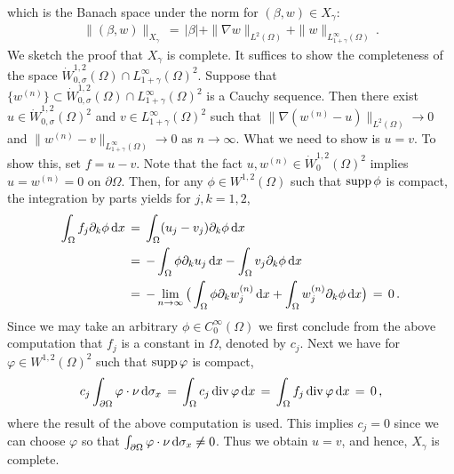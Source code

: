 \documentclass[11pt,a4paper]{article}
\newcommand{\dd}{\,{\rm d}}
\begin{document}
%
which is the Banach space under the norm for $(\beta, w) \in X_\gamma$:
%
\begin{align}
\| (\beta, w) \|_{X_\gamma} \, = \, |\beta| + \| \nabla w\|_{L^2(\Omega)} + \| w \|_{L^\infty_{1+\gamma}(\Omega)}\,.
\end{align} 
%
We sketch the proof that $X_\gamma$ is complete. It suffices to show the completeness of the space $\dot{W}^{1,2}_{0,\sigma} (\Omega) \cap L^\infty_{1+\gamma} (\Omega)^2$. Suppose that $\{w^{(n)}\} \subset \dot{W}^{1,2}_{0,\sigma} (\Omega) \cap L^\infty_{1+\gamma} (\Omega)^2$ is a Cauchy sequence. Then there exist $u \in \dot{W}^{1,2}_{0,\sigma} (\Omega)^2$ and $v \in L^\infty_{1+\gamma} (\Omega)^2$ such that $\|\nabla(w^{(n)} - u)\|_{L^2(\Omega)} \rightarrow 0$ and $\|w^{(n)} - v\|_{L^\infty_{1+\gamma}(\Omega)} \rightarrow 0$ as $n \rightarrow \infty$. What we need to show is $u=v$. To show this, set $f=u-v$.
Note that the fact $u, w^{(n)} \in \dot{W}_0^{1,2}(\Omega)^2$ implies $u=w^{(n)}=0$ on $\partial\Omega$.
Then, for any $\phi \in W^{1,2}(\Omega)$ such that ${\rm supp}\, \phi$ is compact, the integration by parts yields for $j,k=1,2$,
%
\begin{equation*}
\begin{split}
\int_{\Omega}  f_j  \partial_k \phi  \dd x  & \, = \, \int_\Omega (u_j - v_j ) \partial_k \phi \dd x  \\
& \, = \, - \int_\Omega \phi \partial_k u_j  \dd x - \int_\Omega v_j \partial_k \phi \dd x \\ 
& \,=\, - \lim_{n \rightarrow \infty} \big ( \int_{\Omega}  \phi \partial_k w_j^{(n)}  \dd x + \int_{\Omega} w_j^{(n)} \partial_k  \phi \dd x \big ) \,=\, 0\,.
\end{split}
\end{equation*}
%
Since we may take an arbitrary $\phi \in C_0^\infty (\Omega)$ we first conclude from the above computation that $f_j$ is a constant in $\Omega$, denoted by $c_j$. Next we have for $\varphi\in W^{1,2} (\Omega)^2$ such that ${\rm supp}\, \varphi$ is compact,
\begin{align*}
c_j \int_{\partial\Omega} \varphi \cdot \nu   \dd \sigma_x \, = \, \int_\Omega c_j\,  {\rm div}\,  \varphi \dd x \, = \,  \int_\Omega f_j \, {\rm div}\, \varphi \dd x  \, = \, 0\,,
\end{align*}
where the result of the above computation is used.
This implies $c_j=0$ since we can choose $\varphi$ so that $\int_{\partial\Omega} \varphi \cdot \nu \dd \sigma_x \ne 0$. Thus we obtain $u=v$, and hence, $X_\gamma$ is complete.
\end{document}
